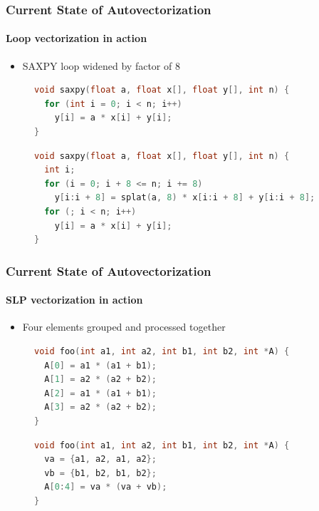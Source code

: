 \documentclass[aspectratio=169]{beamer}
\begin{document}
\begin{frame}[fragile]
  \frametitle{Current State of Autovectorization}
  \framesubtitle{Loop vectorization in action}

  \begin{itemize}
    \item SAXPY loop widened by factor of 8
  \end{itemize}
  \begin{figure}
    \centering
    \begin{minipage}{.45\textwidth}
      \begin{lstlisting}[language=C]
void saxpy(float a, float x[], float y[], int n) {
  for (int i = 0; i < n; i++)
    y[i] = a * x[i] + y[i];
}
      \end{lstlisting}
    \end{minipage}
    \hspace{0.2cm}
    \pause
    \begin{minipage}{.45\textwidth}
      \begin{lstlisting}[language=C]
void saxpy(float a, float x[], float y[], int n) {
  int i;
  for (i = 0; i + 8 <= n; i += 8)
    y[i:i + 8] = splat(a, 8) * x[i:i + 8] + y[i:i + 8];
  for (; i < n; i++)
    y[i] = a * x[i] + y[i];
}
      \end{lstlisting}
    \end{minipage}
  \end{figure}
\end{frame}

\begin{frame}[fragile]
  \frametitle{Current State of Autovectorization}
  \framesubtitle{SLP vectorization in action}

  \begin{itemize}
    \item Four elements grouped and processed together
  \end{itemize}
  \begin{figure}
    \centering
    \begin{minipage}{.45\textwidth}
      \begin{lstlisting}[language=C]
void foo(int a1, int a2, int b1, int b2, int *A) {
  A[0] = a1 * (a1 + b1);
  A[1] = a2 * (a2 + b2);
  A[2] = a1 * (a1 + b1);
  A[3] = a2 * (a2 + b2);
}
      \end{lstlisting}
    \end{minipage}
    \hspace{0.2cm}
    \pause
    \begin{minipage}{.45\textwidth}
      \begin{lstlisting}[language=C]
void foo(int a1, int a2, int b1, int b2, int *A) {
  va = {a1, a2, a1, a2};
  vb = {b1, b2, b1, b2};
  A[0:4] = va * (va + vb);
}
      \end{lstlisting}
    \end{minipage}
  \end{figure}
\end{frame}
\end{document}
